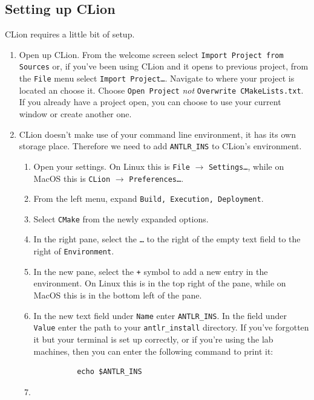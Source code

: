 \documentclass{article}
\newcommand{\code}[1]{\texttt{\textmd{#1}}}
\begin{document}
\subsection{Setting up CLion}
CLion requires a little bit of setup.
\begin{enumerate}
  \item
    Open up CLion. From the welcome screen select \texttt{Import Project from Sources} or, if
    you've been using CLion and it opens to previous project, from the \texttt{File} menu select
    \texttt{Import Project\ldots}. Navigate to where your project is located an choose it. Choose
    \texttt{Open Project} \textit{not} \texttt{Overwrite CMakeLists.txt}. If you already have a
    project open, you can choose to use your current window or create another one.
  \item
    CLion doesn't make use of your command line environment, it has its own storage place.
    Therefore we need to add \code{ANTLR\_INS} to CLion's environment.
    \begin{enumerate}
      \item
        Open your settings. On Linux this is \texttt{File} $\rightarrow$ \texttt{Settings\ldots},
        while on MacOS this is \texttt{CLion} $\rightarrow$ \texttt{Preferences\ldots}.
      \item
        From the left menu, expand \texttt{Build, Execution, Deployment}.
      \item
        Select \texttt{CMake} from the newly expanded options.
      \item
        In the right pane, select the \texttt{\ldots} to the right of the empty text field to the
        right of \texttt{Environment}.
      \item
        In the new pane, select the \texttt{+} symbol to add a new entry in the environment. On
        Linux this is in the top right of the pane, while on MacOS this is in the bottom left of
        the pane.
      \item
        In the new text field under \texttt{Name} enter \code{ANTLR\_INS}. In the field under
        \texttt{Value} enter the path to your \code{antlr\_install} directory. If you've forgotten
        it but your terminal is set up correctly, or if you're using the lab machines, then you can
        enter the following command to print it:
        \begin{lstlisting}
          echo $ANTLR_INS
        \end{lstlisting}
      \item

\end{enumerate}
\end{enumerate}
\end{document}
